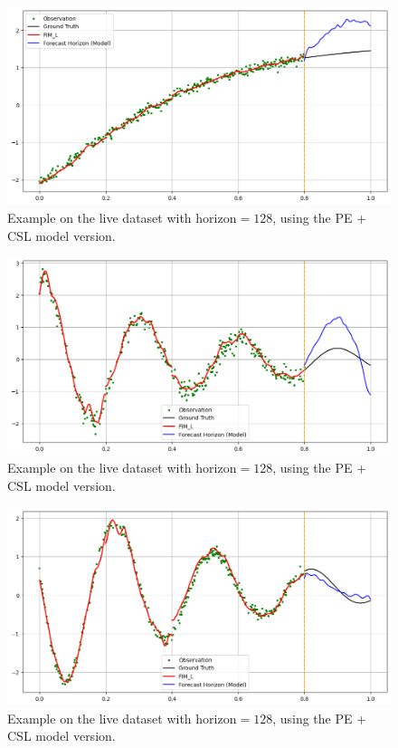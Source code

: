 \documentclass{article}
\theoremstyle{plain}
\theoremstyle{definition}
\theoremstyle{remark}
\begin{document}
\begin{figure}[h!]
    \centering
    \includegraphics[width=\linewidth]{assets/test1.png}
    \caption{Example on the live dataset with $\text{horizon}=128$, using the PE + CSL model version.
    }\label{fig:test1}
\end{figure}
\begin{figure}[h!]
    \centering
    \includegraphics[width=\linewidth]{assets/test2.png}
    \caption{Example on the live dataset with $\text{horizon}=128$, using the PE + CSL model version.
    }\label{fig:test2}
\end{figure}
\begin{figure}[h!]
    \centering
    \includegraphics[width=\linewidth]{assets/test3.png}
    \caption{Example on the live dataset with $\text{horizon}=128$, using the PE + CSL model version.
    }\label{fig:test3}
\end{figure}
\end{document}
